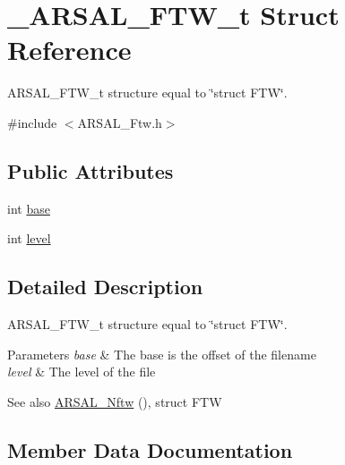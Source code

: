 \hypertarget{struct__ARSAL__FTW__t}{}\section{\+\_\+\+A\+R\+S\+A\+L\+\_\+\+F\+T\+W\+\_\+t Struct Reference}
\label{struct__ARSAL__FTW__t}


A\+R\+S\+A\+L\+\_\+\+F\+T\+W\+\_\+t structure equal to \char`\"{}struct F\+T\+W\char`\"{}.  




{\ttfamily \#include $<$A\+R\+S\+A\+L\+\_\+\+Ftw.\+h$>$}

\subsection*{Public Attributes}
\begin{DoxyCompactItemize}
\item 
int \hyperlink{struct__ARSAL__FTW__t_a0e6a78ca7030bbaa0e5a057381a6cc7c}{base}
\item 
int \hyperlink{struct__ARSAL__FTW__t_a0c7104a8384913f3cf57ed9abb1e70a6}{level}
\end{DoxyCompactItemize}


\subsection{Detailed Description}
A\+R\+S\+A\+L\+\_\+\+F\+T\+W\+\_\+t structure equal to \char`\"{}struct F\+T\+W\char`\"{}. 


\begin{DoxyParams}{Parameters}
{\em base} & The base is the offset of the filename \\
\hline
{\em level} & The level of the file \\
\hline
\end{DoxyParams}
\begin{DoxySeeAlso}{See also}
\hyperlink{ARSAL__Ftw_8h_ac655e97ab59baa526ce37336fa5d47c7}{A\+R\+S\+A\+L\+\_\+\+Nftw} (), struct F\+TW 
\end{DoxySeeAlso}


\subsection{Member Data Documentation}
\hypertarget{struct__ARSAL__FTW__t_a0e6a78ca7030bbaa0e5a057381a6cc7c}{}\label{struct__ARSAL__FTW__t_a0e6a78ca7030bbaa0e5a057381a6cc7c} 

